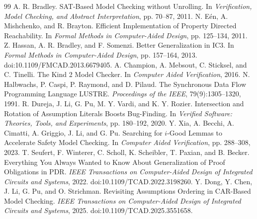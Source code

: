 \documentclass[11pt,a4paper]{article}
\begin{document}
\begin{thebibliography}{99}
   A. R. Bradley. SAT-Based Model Checking without Unrolling. In \emph{Verification, Model Checking, and Abstract Interpretation}, pp. 70--87, 2011.
   N. E\'en, A. Mishchenko, and R. Brayton. Efficient Implementation of Property Directed Reachability. In \emph{Formal Methods in Computer-Aided Design}, pp. 125--134, 2011.
   Z. Hassan, A. R. Bradley, and F. Somenzi. Better Generalization in IC3. In \emph{Formal Methods in Computer-Aided Design}, pp. 157--164, 2013. doi:10.1109/FMCAD.2013.6679405.
   A. Champion, A. Mebsout, C. Sticksel, and C. Tinelli. The Kind 2 Model Checker. In \emph{Computer Aided Verification}, 2016.
   N. Halbwachs, P. Caspi, P. Raymond, and D. Pilaud. The Synchronous Data Flow Programming Language LUSTRE. \emph{Proceedings of the IEEE}, 79(9):1305--1320, 1991.
   R. Dureja, J. Li, G. Pu, M. Y. Vardi, and K. Y. Rozier. Intersection and Rotation of Assumption Literals Boosts Bug-Finding. In \emph{Verified Software: Theories, Tools, and Experiments}, pp. 180--192, 2020.
   Y. Xia, A. Becchi, A. Cimatti, A. Griggio, J. Li, and G. Pu. Searching for $i$-Good Lemmas to Accelerate Safety Model Checking. In \emph{Computer Aided Verification}, pp. 288--308, 2023.
   T. Seufert, F. Winterer, C. Scholl, K. Scheibler, T. Paxian, and B. Becker. Everything You Always Wanted to Know About Generalization of Proof Obligations in PDR. \emph{IEEE Transactions on Computer-Aided Design of Integrated Circuits and Systems}, 2022. doi:10.1109/TCAD.2022.3198260.
   Y. Dong, Y. Chen, J. Li, G. Pu, and O. Strichman. Revisiting Assumptions Ordering in CAR-Based Model Checking. \emph{IEEE Transactions on Computer-Aided Design of Integrated Circuits and Systems}, 2025. doi:10.1109/TCAD.2025.3551658.
\end{thebibliography}
\end{document}
